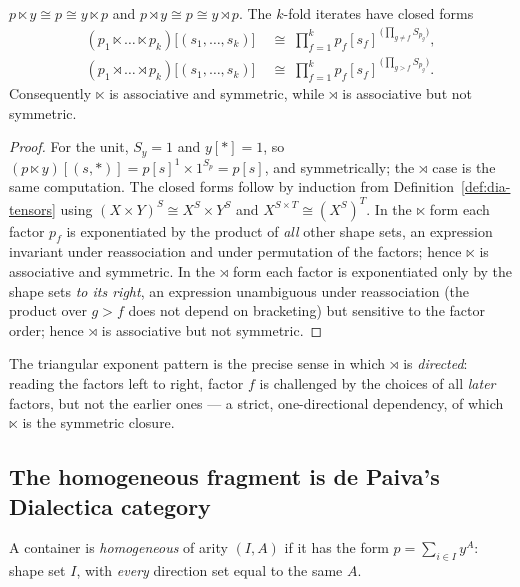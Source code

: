 \begin{Lemma}
\label{lem:nfold}
$p\ltimes y\cong p\cong y\ltimes p$ and $p\rtimes y\cong p\cong y\rtimes p$.
The $k$-fold iterates have closed forms
\begin{align*}
  (p_1\ltimes\dots\ltimes p_k)\bigl[(s_1,\dots,s_k)\bigr]
    &\;\cong\; \prod_{f=1}^{k} p_f[s_f]^{\,\bigl(\prod_{g\neq f}S_{p_g}\bigr)},\\
  (p_1\rtimes\dots\rtimes p_k)\bigl[(s_1,\dots,s_k)\bigr]
    &\;\cong\; \prod_{f=1}^{k} p_f[s_f]^{\,\bigl(\prod_{g> f}S_{p_g}\bigr)} .
\end{align*}
Consequently $\ltimes$ is associative and symmetric, while $\rtimes$ is
associative but not symmetric.
\end{Lemma}

\begin{proof}
For the unit, $S_y=1$ and $y[\ast]=1$, so
$(p\ltimes y)[(s,\ast)]=p[s]^{1}\times 1^{S_p}=p[s]$, and symmetrically; the
$\rtimes$ case is the same computation. The closed forms follow by induction from
Definition~\ref{def:dia-tensors} using $(X\times Y)^{S}\cong X^{S}\times Y^{S}$
and $X^{S\times T}\cong(X^{S})^{T}$. In the $\ltimes$ form each factor $p_f$ is
exponentiated by the product of \emph{all} other shape sets, an expression
invariant under reassociation and under permutation of the factors; hence
$\ltimes$ is associative and symmetric. In the $\rtimes$ form each factor is
exponentiated only by the shape sets \emph{to its right}, an expression
unambiguous under reassociation (the product over $g>f$ does not depend on
bracketing) but sensitive to the factor order; hence $\rtimes$ is associative but
not symmetric.
\end{proof}

The triangular exponent pattern is the precise sense in which $\rtimes$ is
\emph{directed}: reading the factors left to right, factor $f$ is challenged by
the choices of all \emph{later} factors, but not the earlier ones --- a strict,
one-directional dependency, of which $\ltimes$ is the symmetric closure.

\subsection{The homogeneous fragment is de Paiva's Dialectica category}
\label{sec:dia-hmg}

\begin{Definition}
\label{def:homogeneous}
A container is \emph{homogeneous} of arity $(I,A)$ if it has the form
$p=\sum_{i\in I}y^{A}$: shape set $I$, with \emph{every} direction set equal to
the same $A$.
\end{Definition}

